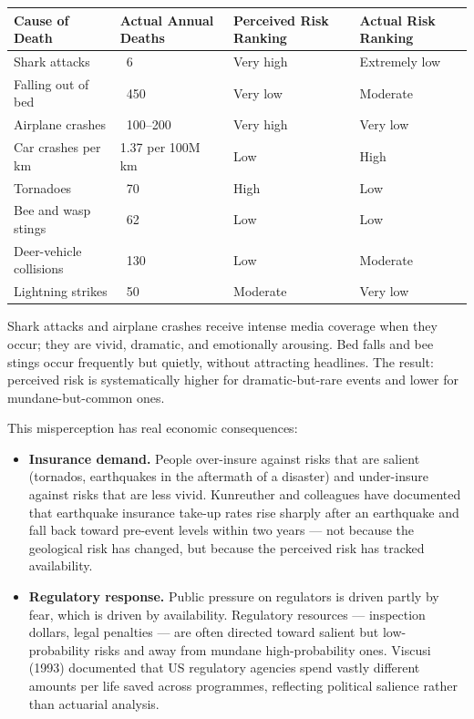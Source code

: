 \documentclass[12pt, letterpaper]{article}
\begin{document}
\begin{table}[H]
\centering
\small
\begin{tabularx}{\linewidth}{lYYY}
\toprule
Cause of Death & Actual Annual Deaths & Perceived Risk Ranking & Actual Risk Ranking \\
\midrule
Shark attacks & ~6 & Very high & Extremely low \\
Falling out of bed & ~450 & Very low & Moderate \\
Airplane crashes & ~100--200 & Very high & Very low \\
Car crashes per km & 1.37 per 100M km & Low & High \\
Tornadoes & ~70 & High & Low \\
Bee and wasp stings & ~62 & Low & Low \\
Deer-vehicle collisions & ~130 & Low & Moderate \\
Lightning strikes & ~50 & Moderate & Very low \\
\bottomrule
\end{tabularx}
\end{table}


Shark attacks and airplane crashes receive intense media coverage when they occur; they are vivid, dramatic, and emotionally arousing. Bed falls and bee stings occur frequently but quietly, without attracting headlines. The result: perceived risk is systematically higher for dramatic-but-rare events and lower for mundane-but-common ones.

This misperception has real economic consequences:

\begin{itemize}
\item \textbf{Insurance demand.} People over-insure against risks that are salient (tornados, earthquakes in the aftermath of a disaster) and under-insure against risks that are less vivid. Kunreuther and colleagues have documented that earthquake insurance take-up rates rise sharply after an earthquake and fall back toward pre-event levels within two years --- not because the geological risk has changed, but because the perceived risk has tracked availability.
\end{itemize}

\begin{itemize}
\item \textbf{Regulatory response.} Public pressure on regulators is driven partly by fear, which is driven by availability. Regulatory resources --- inspection dollars, legal penalties --- are often directed toward salient but low-probability risks and away from mundane high-probability ones. Viscusi (1993) documented that US regulatory agencies spend vastly different amounts per life saved across programmes, reflecting political salience rather than actuarial analysis.
\end{itemize}
\end{document}
